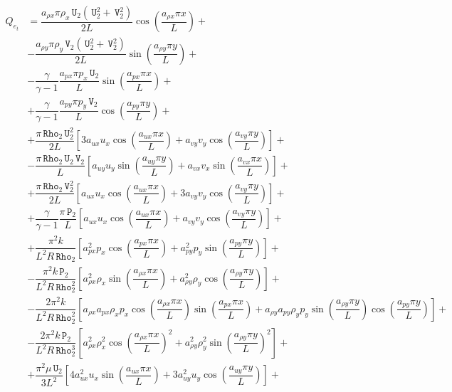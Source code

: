 \documentclass[10pt]{article}
\newcommand{\Rho}{\,\mathtt{Rho}}
\newcommand{\PP}{\,\mathtt{P}}
\newcommand{\U}{\,\mathtt{U}}
\newcommand{\V}{\,\mathtt{V}}
\begin{document}
\begin{equation}
 \begin{split}\label{eq:source_e_2d}
Q_{e_t} &=\dfrac{ a_{\rho x} \pi \rho_x  \U_2 (\U_2^2+\V_2^2)}{2L}\cos\left(\dfrac{a_{\rho x} \pi x}{L}\right)+\\
&-\dfrac{ a_{\rho y} \pi \rho_y \V_2 (\U_2^2+\V_2^2) }{2L}\sin\left(\dfrac{a_{\rho y} \pi y}{L}\right) +\\
&-\dfrac{\gamma}{\gamma-1}\dfrac{a_{px} \pi p_x  \U_2}{L}\sin\left(\dfrac{a_{px} \pi x}{L}\right) +\\
&+  \dfrac{\gamma}{\gamma-1}\dfrac{a_{py}\pi p_y  \V_2}{L}\cos\left(\dfrac{a_{py} \pi y}{L}\right)+\\
&+ \dfrac{ \pi \Rho_2 \U_2^2}{2L}\left[3 a_{ux} u_x \cos\left(\dfrac{a_{ux} \pi x}{L}\right)+a_{vy} v_y \cos\left(\dfrac{a_{vy} \pi y}{L}\right)\right]+\\
&-\dfrac{\pi \Rho_2 \U_2 \V_2}{L}\left[a_{uy} u_y \sin\left(\dfrac{a_{uy} \pi y}{L}\right)+a_{vx}  v_x\sin\left(\dfrac{a_{vx} \pi x}{L}\right)\right] +\\
&+\dfrac{\pi \Rho_2 \V_2^2}{2L} \left[a_{ux} u_x \cos\left(\dfrac{a_{ux} \pi x}{L}\right)+3 a_{vy} v_y \cos\left(\dfrac{a_{vy} \pi y}{L}\right)\right] +\\
&+ \dfrac{\gamma}{\gamma-1}\dfrac{\pi \PP_2}{L}\left[a_{ux} u_x \cos\left(\dfrac{a_{ux} \pi x}{L}\right)+a_{vy} v_y \cos\left(\dfrac{a_{vy} \pi y}{L}\right)\right]+\\
&+\dfrac{ \pi^2 k}{L^2 R \Rho_2}\left[a_{px}^2 p_x \cos\left(\dfrac{a_{px} \pi x}{L}\right)+a_{py}^2 p_y \sin\left(\dfrac{a_{py} \pi y}{L}\right)\right] +\\
&-\dfrac{\pi^2 k \PP_2}{L^2 R \Rho_2^2}\left[a_{\rho x}^2 \rho_x \sin\left(\dfrac{a_{\rho x} \pi x}{L}\right)+a_{\rho y}^2 \rho_y \cos\left(\dfrac{a_{\rho y} \pi y}{L}\right)\right] +\\
&-\dfrac{ 2 \pi^2 k }{L^2 R \Rho_2^2}\left[a_{\rho x} a_{px} \rho_x p_x \cos\left(\dfrac{a_{\rho x} \pi x}{L}\right) \sin\left(\dfrac{a_{px} \pi x}{L}\right)+a_{\rho y} a_{py} \rho_y p_y \sin\left(\dfrac{a_{\rho y} \pi y}{L}\right) \cos\left(\dfrac{a_{py} \pi y}{L}\right)\right]+\\
&- \dfrac{2\pi^2 k \PP_2 }{L^2 R \Rho_2^3}\left[a_{\rho x}^2 \rho_x^2 \cos\left(\dfrac{a_{\rho x} \pi x}{L}\right)^2+a_{\rho y}^2 \rho_y^2 \sin\left(\dfrac{a_{\rho y} \pi y}{L}\right)^2\right] +\\
&+\dfrac{\pi^2 \mu \U_2 }{3L^2} \left[4 a_{ux}^2 u_x\sin\left(\dfrac{a_{ux} \pi x}{L}\right) +3 a_{uy}^2 u_y\cos\left(\dfrac{a_{uy} \pi y}{L}\right) \right] +\\

\end{split}
\end{equation}
\end{document}
